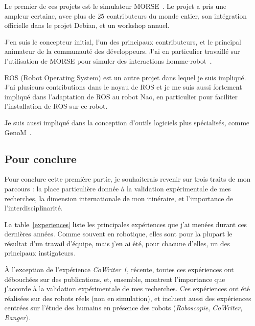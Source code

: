 \documentclass[a4paper]{article}
\begin{document}
Le premier de ces projets est le simulateur MORSE~\cite{Echeverria2011,
echeverria2012simulating}. Le projet a pris une ampleur certaine, avec plus de
25 contributeurs du monde entier, son intégration officielle dans le projet
Debian, et un workshop annuel.

J'en suis le concepteur initial, l'un des principaux contributeurs, et le
principal animateur de la communauté des développeurs. J'ai en particulier
travaillé sur l'utilisation de MORSE pour simuler des interactions
homme-robot~\cite{lemaignan2012morse}.

ROS (Robot Operating System) est un autre projet dans lequel je suis impliqué.
J'ai plusieurs contributions dans le noyau de ROS et je me suis aussi fortement
impliqué dans l'adaptation de ROS au robot Nao, en particulier pour faciliter
l'installation de ROS sur ce robot.

Je suis aussi impliqué dans la conception d'outils logiciels plus spécialisés,
comme GenoM~\cite{mallet2010genom3}.

\subsection{Pour conclure}

Pour conclure cette première partie, je souhaiterais revenir sur trois traits de
mon parcours : la place particulière donnée à la validation expérimentale de mes recherches, la dimension internationale de mon itinéraire, et l'importance de
l'interdisciplinarité.

La table~\ref{experiences} liste les principales expériences que j'ai menées
durant ces dernières années. Comme souvent en robotique, elles sont pour la
plupart le résultat d'un travail d'équipe, mais j'en ai été, pour chacune
d'elles, un des principaux instigateurs.

À l'exception de l'expérience \emph{CoWriter 1}, récente, toutes ces expériences
ont débouchées sur des publications, et, ensemble, montrent l'importance que
j'accorde à la validation expérimentale de mes recherches. Ces expériences ont
été réalisées sur des robots réels (non en simulation), et incluent aussi des
expériences centrées sur l'étude des humains en présence des robots
(\emph{Roboscopie}, \emph{CoWriter}, \emph{Ranger}).
\end{document}
